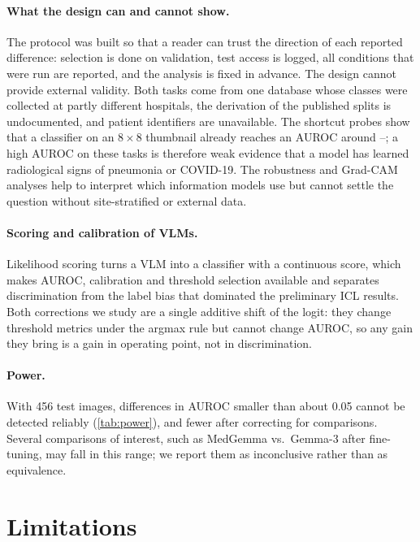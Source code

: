 \documentclass[11pt]{article}
\begin{document}
\paragraph{What the design can and cannot show.} The protocol was built so that a reader can
trust the direction of each reported difference: selection is done on validation, test access
is logged, all conditions that were run are reported, and the analysis is fixed in advance.
The design cannot provide external validity. Both tasks come from one database whose classes
were collected at partly different hospitals, the derivation of the published splits is
undocumented, and patient identifiers are unavailable. The shortcut probes show that a
classifier on an $8\times8$ thumbnail already reaches an AUROC around
\ProbeOneThumbTest{}--\ProbeTwoThumbTest{}; a high AUROC on these tasks is therefore weak evidence
that a model has learned radiological signs of pneumonia or COVID-19. The robustness and
Grad-CAM analyses help to interpret which information models use but cannot settle the question
without site-stratified or external data.

\paragraph{Scoring and calibration of VLMs.} Likelihood scoring turns a VLM into a classifier
with a continuous score, which makes AUROC, calibration and threshold selection available and
separates discrimination from the label bias that dominated the preliminary ICL results. Both
corrections we study are a single additive shift of the logit: they change threshold metrics
under the argmax rule but cannot change AUROC, so any gain they bring is a gain in operating
point, not in discrimination.

\paragraph{Power.} With 456 test images, differences in AUROC smaller than about 0.05 cannot be
detected reliably (\cref{tab:power}), and fewer after correcting for \NPrimaryTests{}
comparisons. Several comparisons of interest, such as MedGemma vs.\ Gemma-3 after fine-tuning,
may fall in this range; we report them as inconclusive rather than as equivalence.

\section{Limitations}
\end{document}
